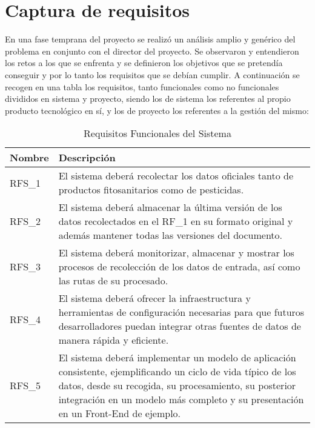 \section{Captura de requisitos}
En una fase temprana del proyecto se realizó un análisis amplio y genérico del problema en conjunto con el director del proyecto. Se observaron y entendieron los retos a los que se enfrenta y se definieron los objetivos que se pretendía conseguir y por lo tanto los requisitos que se debían cumplir. A continuación se recogen en una tabla los requisitos, tanto funcionales como no funcionales divididos en sistema y proyecto, siendo los de sistema los referentes al propio producto tecnológico en sí, y los de proyecto los referentes a la gestión del mismo: \par
\begin{table}[!h]
\centering
\bgroup
\def\arraystretch{1.3}
\begin{tabular}{l p{13cm}}
\toprule
\textbf{Nombre} & \textbf{Descripción} \\
 \midrule
RFS\_1 & 
El sistema deberá recolectar los datos oficiales tanto de productos fitosanitarios como de pesticidas.
 \\
RFS\_2 & 
El sistema deberá almacenar la última versión de los datos recolectados en el RF\_1 en su formato original y además mantener todas las versiones del documento. 
 \\
RFS\_3 & 
El sistema deberá monitorizar, almacenar y mostrar los procesos de recolección de los datos de entrada, así como las rutas de su procesado. 
 \\
RFS\_4 & 
El sistema deberá ofrecer la infraestructura y herramientas de configuración necesarias para que futuros desarrolladores puedan integrar otras fuentes de datos de manera rápida y eficiente. 
 \\
RFS\_5 & 
El sistema deberá implementar un modelo de aplicación consistente, ejemplificando un ciclo de vida típico de los datos, desde su recogida, su procesamiento, su posterior integración en un modelo más completo y su presentación en un Front-End de ejemplo.
 \\
\bottomrule
\end{tabular}
\egroup
\caption{Requisitos Funcionales del Sistema}
\label{tab:req_func_sist}
\end{table}
